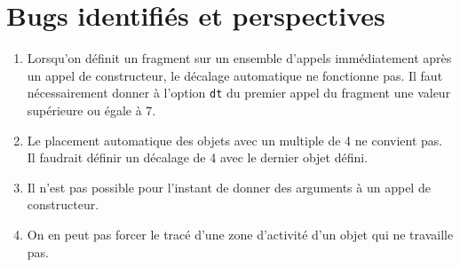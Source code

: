 \documentclass[a4paper,11pt]{report}
\newcommand{\inputTikZ}[1]{%
  }%
\newcommand{\inputTikZ}[1]{%
    \texttt{[image: fig/\#1.pdf]}%
  }%
\begin{document}
\begin{center}
\inputTikZ{figure84}
\end{center}

\section{Bugs identifiés et perspectives}\label{s.seqbug}

\begin{enumerate}
\item Lorsqu'on définit un fragment sur un ensemble d'appels immédiatement après un appel de constructeur, le décalage automatique ne fonctionne pas. Il faut nécessairement donner à l'option {\tt dt} du premier appel du fragment une valeur supérieure ou égale à 7.
\item Le placement automatique des objets avec un multiple de 4 ne convient pas. Il faudrait définir un décalage de 4 avec le dernier objet défini.
\item Il n'est pas possible pour l'instant de donner des arguments à un appel de constructeur.
\item On en peut pas forcer le tracé d'une zone d'activité d'un objet qui ne \og travaille\fg{} pas.

\begin{center}
\inputTikZ{figure85}
\end{center}

\end{enumerate}
\end{document}

